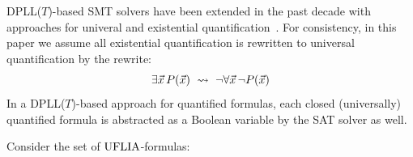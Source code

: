 \documentclass[oribibl]{llncs}
\begin{document}

DPLL($T$)-based SMT solvers have been extended in the past decade with approaches for univeral and existential quantification~\cite{}.
For consistency, in this paper we assume all existential quantification is rewritten to universal quantification by the rewrite:
\[
\exists \vec x\, P( \vec x ) \ \leadsto \  \neg \forall \vec x\, \neg P( \vec x )
\]
In a DPLL($T$)-based approach for quantified formulas, 
each closed (universally) quantified formula is abstracted as a Boolean variable by the SAT solver as well.

\begin{example}
Consider the set of $\mathrm{UFLIA}$-formulas:

\end{example}
\end{document}
